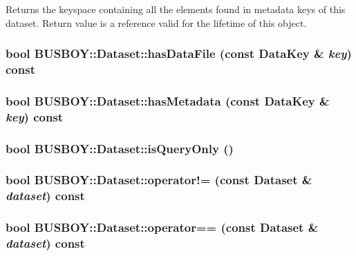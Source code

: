 Returns the keyspace containing all the elements found in metadata keys of this dataset. Return value is a reference valid for the lifetime of this object. \hypertarget{classBUSBOY_1_1Dataset_a64cd95914f1c015beb705360e2dcd8ea}{
\subsubsection[{hasDataFile}]{\setlength{\rightskip}{0pt plus 5cm}bool BUSBOY::Dataset::hasDataFile (const {\bf DataKey} \& {\em key}) const}}
\label{classBUSBOY_1_1Dataset_a64cd95914f1c015beb705360e2dcd8ea}
\hypertarget{classBUSBOY_1_1Dataset_a06a24c865a3d0cb9e347436a054e42ae}{
\subsubsection[{hasMetadata}]{\setlength{\rightskip}{0pt plus 5cm}bool BUSBOY::Dataset::hasMetadata (const {\bf DataKey} \& {\em key}) const}}
\label{classBUSBOY_1_1Dataset_a06a24c865a3d0cb9e347436a054e42ae}
\hypertarget{classBUSBOY_1_1Dataset_a7dfe0e5162bfeaf7b0ae2dcf5d842dc5}{
\subsubsection[{isQueryOnly}]{\setlength{\rightskip}{0pt plus 5cm}bool BUSBOY::Dataset::isQueryOnly ()}}
\label{classBUSBOY_1_1Dataset_a7dfe0e5162bfeaf7b0ae2dcf5d842dc5}
\hypertarget{classBUSBOY_1_1Dataset_af23f44e8c556cce885362632e449e9a7}{
\subsubsection[{operator!=}]{\setlength{\rightskip}{0pt plus 5cm}bool BUSBOY::Dataset::operator!= (const {\bf Dataset} \& {\em dataset}) const}}
\label{classBUSBOY_1_1Dataset_af23f44e8c556cce885362632e449e9a7}
\hypertarget{classBUSBOY_1_1Dataset_a18b50dbc0c385a74b2792573f7285266}{
\subsubsection[{operator==}]{\setlength{\rightskip}{0pt plus 5cm}bool BUSBOY::Dataset::operator== (const {\bf Dataset} \& {\em dataset}) const}}
